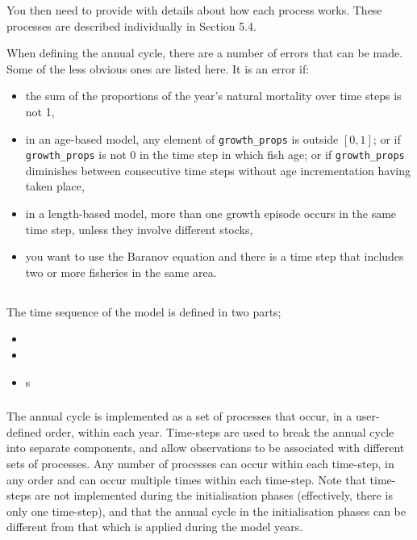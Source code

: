 You then need to provide \cas with details about how each process works. These processes are described individually in Section 5.4. 

When defining the annual cycle, there are a number of errors that can be made. Some of the less obvious ones are listed here. It is an error if: 

\begin{itemize}
\item	the sum of the proportions of the year’s natural mortality over time steps is not 1,
\item	in an age-based model, any element of \texttt{growth\_props} is outside $[0,1]$; or if \texttt{growth\_props} is not 0 in the time step in which fish age; or if \texttt{growth\_props} diminishes between consecutive time steps without age incrementation having taken place,
\item	in a length-based model, more than one growth episode occurs in the same time step, unless they involve different stocks,
\item  you want to use the Baranov equation and there is a time step that includes two or more fisheries in the same area.
\end{itemize}


\subsection{}

The time sequence of the model is defined in two parts;
\begin{itemize}
  \item {}
  \item {}
  \item {}s
\end{itemize}

\subsubsection{}

The annual cycle is implemented as a set of processes that occur, in a user-defined order, within each year. Time-steps are used to break the annual cycle into separate components, and allow observations to be associated with different sets of processes. Any number of processes can occur within each time-step, in any order and can occur multiple times within each time-step. Note that time-steps are not implemented during the initialisation phases (effectively, there is only one time-step), and that the annual cycle in the initialisation phases can be different from that which is applied during the model years.

